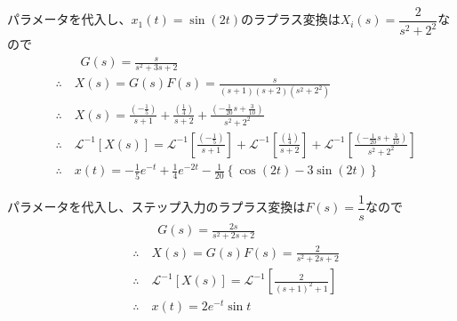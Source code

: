 \documentclass[a4paper,12pt]{article}
\begin{document}
\begin{tcolorbox}[title={5. (6)\(m=1,d_1=1,d_2=2,k=2\)とし、入力変位\(x_1(t)=\sin(2t)\)を与えたときの応
\indent \quad 答を求めよ。 }]

パラメータを代入し、\(x_1(t)=\sin(2t)\)のラプラス変換は\(X_i(s)=\dfrac{2}{s^2+2^2}\)なので
    \vspace{-4mm}
    \begin{align*}
        &\qquad G(s) = \frac{s}{s^2 + 3s + 2} \\
        &\therefore \quad X(s) = G(s) F(s) = \frac{s}{(s+1)(s+2)(s^2+2^2)} \\
        &\therefore \quad X(s) =  \frac{\left(-\frac{1}{5}\right)}{s+1} 
        + \frac{\left(\frac{1}{4}\right)}{s+2}
        + \frac{\left(-\frac{1}{20}s+\frac{3}{10}\right)}{s^2+2^2}\\
        &\therefore \quad \mathcal{L}^{-1} \left[ X(s)\right] 
        = \mathcal{L}^{-1} \left[\frac{\left(-\frac{1}{5}\right)}{s+1}  \right]
        + \mathcal{L}^{-1} \left[\frac{\left(\frac{1}{4}\right)}{s+2} \right]
        + \mathcal{L}^{-1} \left[\frac{\left(-\frac{1}{20}s+\frac{3}{10}\right)}{s^2+2^2}\right]  \\
        &\therefore \quad x(t) = -\frac{1}{5} e^{-t} + \frac{1}{4} e^{-2t} - \frac{1}{20} \left\{ \cos (2t) - 3\sin (2t)\right\}
    \end{align*}

\end{tcolorbox}

\begin{tcolorbox}[title={5. (7)\(m=1,d_1=2,d_2=0,k=2\)とし、ステップ応答を求めよ。 }]

    パラメータを代入し、ステップ入力のラプラス変換は\(F(s)=\dfrac{1}{s}\)なので
    \vspace{-4mm}
    \begin{align*}
        &\qquad G(s) = \frac{2s}{s^2 + 2s + 2} \\
        &\therefore \quad X(s) = G(s) F(s) 
        = \frac{2}{s^2 + 2s + 2} \\
        &\therefore \quad \mathcal{L}^{-1} \left[ X(s)\right] 
        = \mathcal{L}^{-1} \left[\frac{2}{(s+1)^2+1}\right] \\
        &\therefore \quad x(t) = 2 e^{-t} \sin t
    \end{align*}

\end{tcolorbox}
\end{document}
